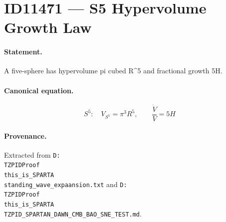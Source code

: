 \section*{ID11471 --- S5 Hypervolume Growth Law}

\paragraph{Statement.}
A five-sphere has hypervolume pi cubed R^5 and fractional growth 5H.

\paragraph{Canonical equation.}
\[
S^5:\quad V_{S^5}=\pi^3R^5,\qquad\frac{\dot V}{V}=5H
\]

\paragraph{Provenance.}
Extracted from \texttt{D:\\TZPIDProof\\this\_is\_SPARTA\\standing\_wave\_expaansion.txt} and \texttt{D:\\TZPIDProof\\this\_is\_SPARTA\\TZPID\_SPARTAN\_DAWN\_CMB\_BAO\_SNE\_TEST.md}.
